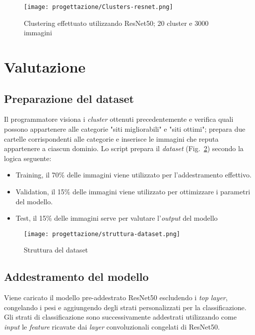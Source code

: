\begin{figure}[!h] 
  \centering 
  \texttt{[image: progettazione/Clusters-resnet.png]} 
  \caption{Clustering effettuato utilizzando ResNet50; 20 cluster e 3000 immagini}
  \label{fig:clusters-resnet}
\end{figure}



\newpage

\section{Valutazione}

\subsection{Preparazione del dataset}
Il programmatore visiona i \emph{cluster} ottenuti precedentemente e verifica quali possono appartenere alle categorie "siti migliorabili" e "siti ottimi"; prepara due cartelle corrispondenti alle categorie e inserisce le immagini che reputa appartenere a ciascun dominio.
Lo script prepara il \emph{\gls{dataset}} (Fig.~\ref{fig:struttura-dataset}) secondo la logica seguente:
\begin{itemize}
  \item Training, il 70\% delle immagini viene utilizzato per l'addestramento effettivo.
  \item Validation, il 15\% delle immagini viene utilizzato per ottimizzare i parametri del modello.
  \item Test, il 15\% delle immagini serve per valutare l'\emph{output} del modello
\end{itemize}

\begin{figure}[!h] 
  \centering 
  \texttt{[image: progettazione/struttura-dataset.png]} 
  \caption{Struttura del dataset}
  \label{fig:struttura-dataset}
\end{figure}

\subsection{Addestramento del modello}
Viene caricato il modello pre-addestrato ResNet50 escludendo i \emph{top layer}, congelando i pesi e aggiungendo degli strati personalizzati per la classificazione.
Gli strati di classificazione sono successivamente addestrati utilizzando come \emph{input} le \emph{\gls{feature}} ricavate dai \emph{layer} convoluzionali congelati di ResNet50. 

